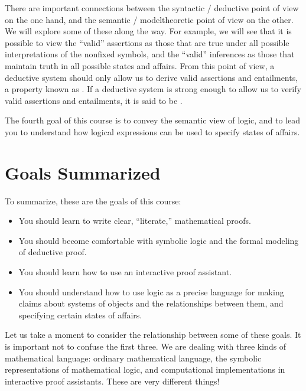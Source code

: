 \documentclass[letterpaper,10pt,english]{sphinxmanual}
\begin{document}
\sphinxAtStartPar
There are important connections between the syntactic / deductive point of view on the one hand, and the semantic / model\sphinxhyphen{}theoretic point of view on the other. We will explore some of these along the way. For example, we will see that it is possible to view the “valid” assertions as those that are true under all possible interpretations of the non\sphinxhyphen{}fixed symbols, and the “valid” inferences as those that maintain truth in all possible states and affairs. From this point of view, a deductive system should only allow us to derive valid assertions and entailments, a property known as . If a deductive system is strong enough to allow us to verify  valid assertions and entailments, it is said to be .

\sphinxAtStartPar
The fourth goal of this course is to convey the semantic view of logic, and to lead you to understand how logical expressions can be used to specify states of affairs.


\section{Goals Summarized}
\label{\detokenize{introduction:goals-summarized}}
\sphinxAtStartPar
To summarize, these are the goals of this course:
\begin{itemize}
\item {} 
\sphinxAtStartPar
You should learn to write clear, “literate,” mathematical proofs.

\item {} 
\sphinxAtStartPar
You should become comfortable with symbolic logic and the formal modeling of deductive proof.

\item {} 
\sphinxAtStartPar
You should learn how to use an interactive proof assistant.

\item {} 
\sphinxAtStartPar
You should understand how to use logic as a precise language for making claims about systems of objects and the relationships between them, and specifying certain states of affairs.

\end{itemize}

\sphinxAtStartPar
Let us take a moment to consider the relationship between some of these goals. It is important not to confuse the first three. We are dealing with three kinds of mathematical language: ordinary mathematical language, the symbolic representations of mathematical logic, and computational implementations in interactive proof assistants. These are very different things!
\end{document}
